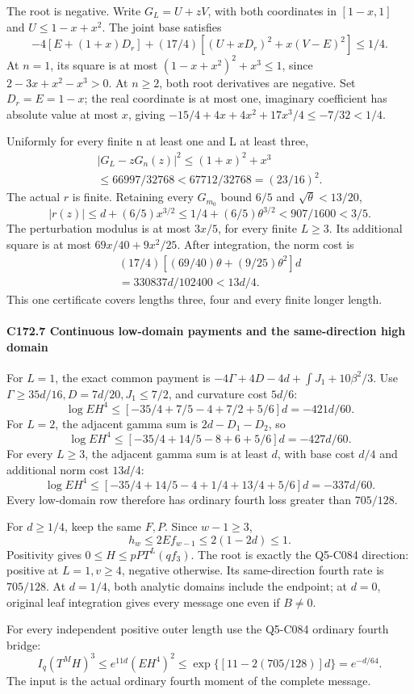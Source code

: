 The root is negative. Write \(G_L=U+zV\), with both coordinates in \([1-x,\allowbreak \allowbreak  1]\) and \(U\le1-x+x^2\). The joint base satisfies
\[
-4[E+(1+x)D_r]+(17/4)[(U+xD_r)^2+x(V-E)^2]\le1/4.       \tag{C172.T179.29}
\]
At \(n=1\), its square is at most \((1-x+x^2)^2+x^3\le1\), since \(2-3x+x^2-x^3>0\). At \(n\ge2\), both root derivatives are negative. Set \(D_r=E=1-x\); the real coordinate is at most one, imaginary coefficient has absolute value at most \(x\), giving \(-15/4+4x+4x^2+17x^3/4\le-7/32<1/4\).

Uniformly for every finite n at least one and L at least three,
\[
\begin{gathered}
|G_L-zG_n(z)|^2\le(1+x)^2+x^3\\
\le66997/32768<67712/32768=(23/16)^2.
\end{gathered}\tag{C172.T179.30}
\]
The actual \(r\) is finite. Retaining every \(G_{m_0}\) bound \(6/5\) and \(\sqrt\theta<13/20\),
\[
|r(z)|\le d+(6/5)x^{3/2}
\le1/4+(6/5)\theta^{3/2}<907/1600<3/5.
\]
The perturbation modulus is at most \(3x/5\), for every finite \(L\ge3\). Its additional square is at most \(69x/40+9x^2/25\). After integration, the norm cost is
\[
\begin{gathered}
(17/4)[(69/40)\theta+(9/25)\theta^2]d\\
=330837d/102400<13d/4.
\end{gathered}\tag{C172.T179.31}
\]
This one certificate covers lengths three, four and every finite longer length.

\paragraph{C172.7 Continuous low-domain payments and the same-direction high domain}

For \(L=1\), the exact common payment is \(-4\Gamma+4D-4d+\int J_1+10\beta^2/3\). Use \(\Gamma\ge35d/16,\allowbreak \allowbreak  D=7d/20,\allowbreak \allowbreak  J_1\le7/2\), and curvature cost \(5d/6\):
\[
\log EH^4\le[-35/4+7/5-4+7/2+5/6]d=-421d/60.
\]
For \(L=2\), the adjacent gamma sum is \(2d-D_1-D_2\), so
\[
\log EH^4\le[-35/4+14/5-8+6+5/6]d=-427d/60.
\]
For every \(L\ge3\), the adjacent gamma sum is at least \(d\), with base cost \(d/4\) and additional norm cost \(13d/4\):
\[
\log EH^4\le[-35/4+14/5-4+1/4+13/4+5/6]d=-337d/60.
\]
Every low-domain row therefore has ordinary fourth loss greater than \(705/128\).

For \(d\ge1/4\), keep the same \(F,\allowbreak \allowbreak  P\). Since \(w-1\ge3\),
\[
h_w\le2Ef_{w-1}\le2(1-2d)\le1.
\]
Positivity gives \(0\le H\le pPT^L(qf_3)\). The root is exactly the Q5-C084 direction: positive at \(L=1,\allowbreak \allowbreak  v\ge4\), negative otherwise. Its same-direction fourth rate is \(705/128\). At \(d=1/4\), both analytic domains include the endpoint; at \(d=0\), original leaf integration gives every message one even if \(B\ne0\).

For every independent positive outer length use the Q5-C084 ordinary fourth bridge:
\[
I_q(T^MH)^3\le e^{11d}(EH^4)^2
\le\exp\{[11-2(705/128)]d\}=e^{-d/64}.
\]
The input is the actual ordinary fourth moment of the complete message.
